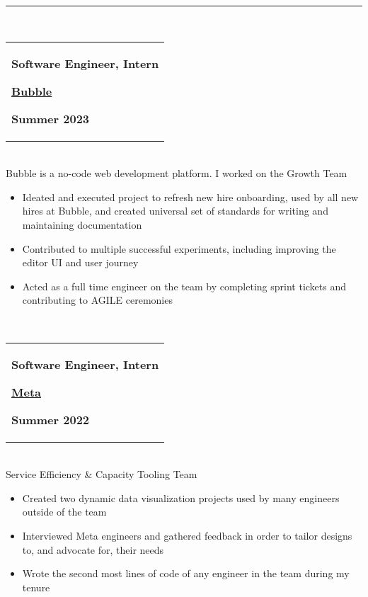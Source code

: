 \documentclass[9pt]{extarticle}
\begin{document}
\rule{\textwidth}{0.4pt}\\ 
\begin{tabular}{@{}p{\textwidth}}\begin{minipage}[t]{0.333\textwidth}
\raggedright
\textbf{Software Engineer, Intern}
\end{minipage}%
\begin{minipage}[t]{0.333\textwidth}
\centering
\textbf{\underline{Bubble}}
\end{minipage}%
\begin{minipage}[t]{0.333\textwidth}
\raggedleft
\textbf{Summer 2023}
\end{minipage}%
\end{tabular}\\[0.5ex]
Bubble is a no-code web development platform. I worked on the Growth Team\\ 
\vspace{-\baselineskip}
\begin{itemize}[itemsep=0pt, topsep=0pt]
\item Ideated and executed project to refresh new hire onboarding, used by all new hires at Bubble, and created universal set of standards for writing and maintaining documentation
\item Contributed to multiple successful experiments, including improving the editor UI and user journey
\item Acted as a full time engineer on the team by completing sprint tickets and contributing to AGILE ceremonies
\end{itemize}~\\[-1ex]
\begin{tabular}{@{}p{\textwidth}}\begin{minipage}[t]{0.333\textwidth}
\raggedright
\textbf{Software Engineer, Intern}
\end{minipage}%
\begin{minipage}[t]{0.333\textwidth}
\centering
\textbf{\underline{Meta}}
\end{minipage}%
\begin{minipage}[t]{0.333\textwidth}
\raggedleft
\textbf{Summer 2022}
\end{minipage}%
\end{tabular}\\[0.5ex]
Service Efficiency \& Capacity Tooling Team\\ 
\vspace{-\baselineskip}
\begin{itemize}[itemsep=0pt, topsep=0pt]
\item Created two dynamic data visualization projects used by many engineers outside of the team
\item Interviewed Meta engineers and gathered feedback in order to tailor designs to, and advocate for, their needs
\item Wrote the second most lines of code of any engineer in the team during my tenure
\end{itemize}~\\[-1ex]
\end{document}

